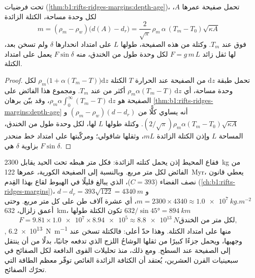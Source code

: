 \begin{proposition}\label{prop:b1:active-margins:slab-weight}
تحت فرضيات  (\cref{thm:b1:rifts-ridges-margins:depth-age})، تحمل صفيحة عمرها $A$، لكل وحدة مساحة، الكتلة الزائدة
\[
  m = (\rho_m - \rho_w)\bigl(d(A) - d_r\bigr)
    = \frac{2}{\sqrt\pi}\,\rho_m\,\alpha\,(T_m - T_0)\sqrt{\kappa A}
\]
فوق  عند $T_m$. وكتلة من هذه الصفيحة، طولها $L$ على امتداد انحدارها $\delta$ ولم تسخن بعد، لها ثقل زائد $F = g\,m\,L$ لكل وحدة طول من الخندق، منه $F\sin\delta$ يعمل على امتداد الكتلة.
\end{proposition}

\begin{proof}
تحمل طبقة $\mathrm dz$ من الصفيحة عند الحرارة $T$ الكتلة
$\rho_m\bigl(1 + \alpha(T_m - T)\bigr)\mathrm dz$ لكل وحدة مساحة، أي
$\rho_m\alpha(T_m - T)\,\mathrm dz$ أكثر من  عند $T_m$. ومجموع هذا الفائض على الصفيحة هو $\rho_m\alpha\int_0^\infty (T_m - T)\,\mathrm dz$، وقد بيّن برهان \cref{thm:b1:rifts-ridges-margins:depth-age} أنه يساوي كلًّا من $(\rho_m - \rho_w)(d - d_r)$ و$(2/\sqrt\pi)\rho_m\alpha(T_m - T_0)
\sqrt{\kappa A}$. وكتلة طولها $L$ لها، لكل وحدة طول من الخندق، المساحة $L$ وإذن الكتلة الزائدة $mL$، وثقلها شاقولي؛ ومركّبتها على امتداد خط منحدر بزاوية $\delta$ هي $F\sin\delta$.
\end{proof}

فقاع المحيط إذن يحمل كتلته الزائدة: فكل متر هبطه تحت الحيد يقابل \qty{2300}{kg} من الفائض لكل متر مربع. وبالنسبة إلى الصفيحة الكورية، عمرها \qty{122}{Myr}، يعطي قانون نصف الفضاء ($C = 393$)، الذي يبالغ قليلًا في الهبوط لقاع بهذا القِدم (\cref{ch:b1:rifts-ridges-margins})، $d - d_r = 393\sqrt{122} = \qty{4340}{m}$ و$m = 2300\times4340 \approx \qty{1.0e7}{kg.m^{-2}}$، أي عشرة آلاف طن على كل متر مربع. وحتى أعمق زلزال، \qty{632}{km}، تكون الكتلة طولها $632/\sin\ang{45} = \qty{894}{km}$
\[
  F = 9.81 \times \num{1.0e7} \times \num{8.94e5} \approx \qty{8.8e13}{N}
  \text{لكل متر من الخندق},
\],
\qty{6.2e13}{N.m^{-1}} منها على امتداد الكتلة. وهذا حدّ أعلى: فالكتلة تسخن عند وجهيها، ويحمل جزءًا كبيرًا من ثقلها الوشاحُ اللزج الذي تدفعه جانبًا، بدلًا من أن ينتقل إلى الصفيحة عند السطح. ومع ذلك، منذ تحليلات القوى الدافعة لكل الصفائح في سبعينيات القرن العشرين، يُعتقد أن الكثافة الزائدة  الغائص توفّر معظم الطاقة التي تحرّك الصفائح.

